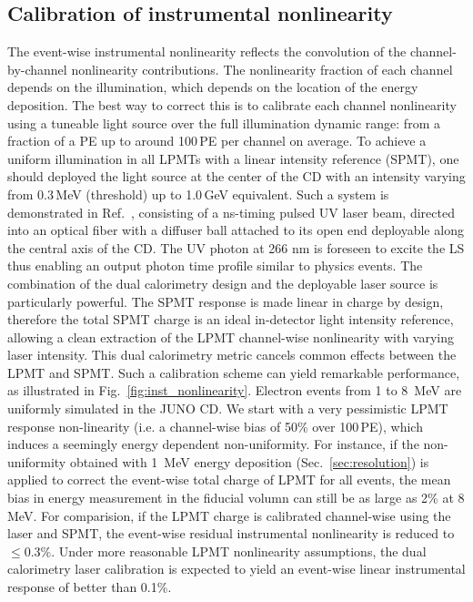 \documentclass[a4paper,10pt,twoside]{cpc-hepnp}
\begin{document}
\begin{CJK*}{GB}{gbsn}
\begin{multicols}{2}
\subsection{Calibration of instrumental nonlinearity}
\label{sec:elec_nonlin}
  The event-wise instrumental nonlinearity reflects the
  convolution of the channel-by-channel nonlinearity
  contributions. The nonlinearity fraction of each channel depends on
  the illumination, which depends on the location of the energy
  deposition. The best way to correct this is to calibrate each
  channel nonlinearity using a tuneable light source over the full
  illumination dynamic range: from a fraction of a PE up to around
  100\,PE per channel on average. To achieve a uniform illumination in
  all LPMTs with a linear intensity reference (SPMT), one should
  deployed the light source at the center of the CD with an intensity
  varying from 0.3\,MeV (threshold) up to 1.0\,GeV equivalent.
Such a system is demonstrated in Ref.~\cite{zhangyuanyuanpaper},
consisting of a ns-timing pulsed UV laser beam, directed into an
optical fiber with a diffuser ball attached to its open end deployable
along the central axis of the CD. The UV photon at 266 nm is foreseen
to excite the LS thus enabling an output photon time profile similar
to physics events.  The combination of the dual calorimetry design and
the deployable laser source is particularly powerful.
  The SPMT response is made linear in charge by design,
  therefore the total SPMT charge is an ideal in-detector light
  intensity reference, allowing a clean extraction of the LPMT
  channel-wise nonlinearity with varying laser intensity.
  This dual calorimetry metric cancels common effects between the LPMT
  and SPMT.
  Such a calibration scheme can yield remarkable performance, as
  illustrated in Fig.~\ref{fig:inst_nonlinearity}. Electron events
  from 1 to 8~MeV are uniformly simulated in the JUNO CD. We start
  with a very pessimistic LPMT response non-linearity (i.e. a
  channel-wise bias of 50\% over 100\,PE), which induces a seemingly
  energy dependent non-uniformity. For instance, if the non-uniformity
  obtained with 1~MeV energy deposition ({Sec.~\ref{sec:resolution}})
  is applied to correct the event-wise total charge of LPMT for all
  events, the mean bias in energy measurement in the fiducial volumn
  can still be as large as 2\% at 8 MeV. For comparision, if the LPMT
  charge is calibrated channel-wise using the laser and SPMT, the
  event-wise residual instrumental nonlinearity is reduced to
  $\leq$0.3\%. Under more reasonable LPMT nonlinearity assumptions,
  the dual calorimetry laser calibration is expected to yield an
  event-wise linear instrumental response of better than 0.1\%.


\end{multicols}
\end{CJK*}
\end{document}
